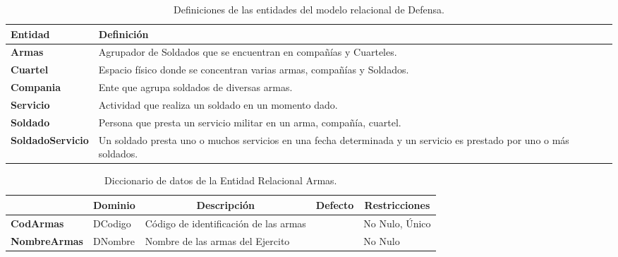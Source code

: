 \begin{table}[H]
\centering
\caption{Definiciones de las entidades del modelo relacional de Defensa.}
\renewcommand{\arraystretch}{1.5}%
\label{tab-DiccR-00}
\begin{tabular}{>{\bfseries}m{5cm}>{}m{15cm}}
\toprule
\textbf{Entidad}  & \textbf{Definición}\\ \midrule
Armas    & Agrupador de Soldados que se encuentran en compañías y Cuarteles. \\
Cuartel  & Espacio físico donde se concentran varias armas, compañías y Soldados.\\
Compania & Ente que agrupa soldados de diversas armas.\\
Servicio & Actividad que realiza un soldado en un momento dado.\\
Soldado  & Persona que presta un servicio militar en un arma, compañía, cuartel.\\ 
SoldadoServicio & Un soldado presta uno o muchos servicios en una fecha determinada y un servicio es prestado por uno o más soldados.\\
\bottomrule
\end{tabular}
\end{table}

\begin{table}[H]
\centering
\caption{Diccionario de datos de la Entidad Relacional Armas.}
\label{tab-DiccR-01}
\begin{tabular}{>{\bfseries}m{4.0cm}>{}m{3.0cm}>{}m{6.0cm}>{}m{5.0cm}>{}m{2.0cm}}
\toprule
\multicolumn{1}{c}{\textbf{Atributo}} & \multicolumn{1}{c}{\textbf{Dominio}} & \multicolumn{1}{c}{\textbf{Descripción}} & \multicolumn{1}{c}{\textbf{Defecto}} & \multicolumn{1}{c}{\textbf{Restricciones}} \\ \midrule
CodArmas    & DCodigo   & Código de identificación de las armas &   & No Nulo, Único\\
NombreArmas & DNombre   & Nombre de las armas del Ejercito  &   & No Nulo\\ \bottomrule
\end{tabular}
\end{table}

